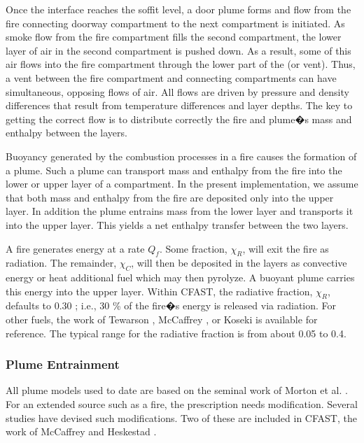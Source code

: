 Once the interface reaches the soffit level, a door plume forms and flow from the fire connecting doorway compartment to the next compartment is initiated.  As smoke flow from the fire compartment fills the second compartment, the lower layer of air in the second compartment is pushed down. As a result, some of this air flows into the fire compartment through the lower part of the (or vent).  Thus, a vent between the fire compartment and connecting compartments can have simultaneous, opposing flows of air.  All flows are driven by pressure and density differences that result from temperature differences and layer depths. The key to getting the correct flow is to distribute correctly the fire and plume�s mass and enthalpy between the layers.

Buoyancy generated by the combustion processes in a fire causes the formation of a plume.
Such a plume can transport mass and enthalpy from the fire into the lower or upper layer of a
compartment.  In the present implementation, we assume that both mass and enthalpy from the
fire are deposited only into the upper layer.  In addition the plume entrains mass from the lower
layer and transports it into the upper layer.  This yields a net enthalpy transfer between the two
layers.

A fire generates energy at a rate $Q_f$.  Some fraction, $\chi_R$, will exit the fire as radiation.  The remainder, $\chi_C$, will then be deposited in the layers as convective energy or heat additional fuel which may then pyrolyze. A buoyant plume carries this energy into the upper layer. Within CFAST, the radiative fraction, $\chi_R$, defaults to 0.30 \cite{Drysdale:1985}; i.e., 30 \% of the fire�s energy is released via radiation.  For other fuels, the work of Tewarson \cite{Tewarson:1978}, McCaffrey \cite{McCaffrey:1982}, or Koseki \cite{Koseki:1989} is available for reference.  The typical range for the radiative fraction is from about 0.05 to 0.4.

\subsubsection{Plume Entrainment}

All plume models used to date are based on the seminal work of Morton et al. \cite{Morton:1956}. For an extended source such as a fire, the prescription needs modification. Several studies have devised such modifications. Two of these are included in CFAST, the work of McCaffrey \cite{McCaffrey:1983} and Heskestad \cite{Heskestad:1984}.

